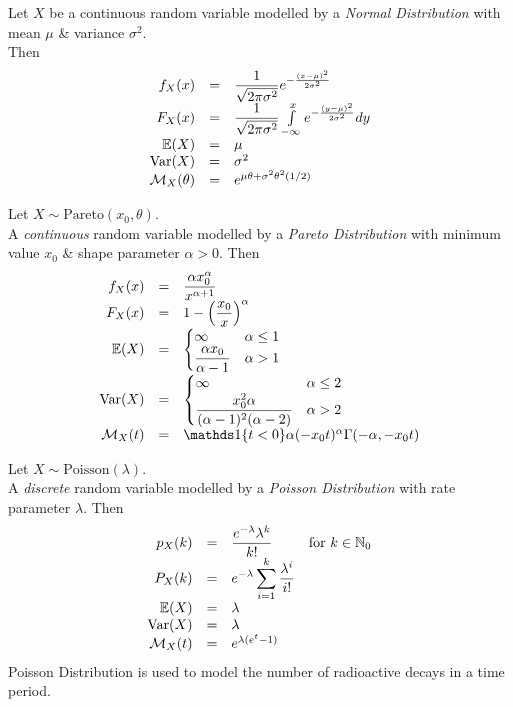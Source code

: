 \documentclass[11pt,a4paper]{article}
\begin{document}
Let $X$ be a continuous random variable modelled by a \textit{Normal Distribution} with mean $\mu$ \& variance $\sigma^2$.\\
Then
\[\begin{array}{rcl}
f_X(x)&=&\dfrac{1}{\sqrt{2\pi\sigma^2}}e^{-\frac{(x-\mu)^2}{2\sigma^2}}\\
F_X(x)&=&\dfrac{1}{\sqrt{2\pi\sigma^2}}\int\limits_{-\infty}^xe^{-\frac{(y-\mu)^2}{2\sigma^2}}dy\\
\mathbb{E}(X)&=&\mu\\
\mathrm{Var}(X)&=&\sigma^2\\
\mathcal{M}_X(\theta)&=&e^{\mu\theta+\sigma^2\theta^2(1/2)}
\end{array}\]

Let $X\sim\text{Pareto}(x_0,\theta)$.\\
A \textit{continuous} random variable modelled by a \textit{Pareto Distribution} with minimum value $x_0$ \& shape parameter $\alpha>0$. Then
\[\begin{array}{rcll}
f_X(x)&=&\dfrac{\alpha x_0^\alpha}{x^{\alpha+1}}\\
F_X(x)&=&1-\left(\dfrac{x_0}{x}\right)^\alpha\\
\expect(X)&=&\begin{cases}\infty&\alpha\leq1\\\dfrac{\alpha x_0}{\alpha-1}&\alpha>1\end{cases}\\
\var(X)&=&\begin{cases}\infty&\alpha\leq2\\\dfrac{x_0^2\alpha}{(\alpha-1)^2(\alpha-2)}&\alpha>2\end{cases}\\
\mathcal{M}_X(t)&=&\indicator\{t<0\}\alpha(-x_0t)^\alpha\Gamma(-\alpha,-x_0t)
\end{array}\]

Let $X\sim\text{Poisson}(\lambda)$.\\
A \textit{discrete} random variable modelled by a \textit{Poisson Distribution} with rate parameter $\lambda$. Then
\[\begin{array}{rcll}
p_X(k)&=&\dfrac{e^{-\lambda}\lambda^k}{k!}&\text{for }k\in\mathbb{N}_0\\
P_X(k)&=&{\displaystyle e^{-\lambda}\sum_{i=1}^k\frac{\lambda^i}{i!}}\\
\mathbb{E}(X)&=&\lambda\\
\mathrm{Var}(X)&=&\lambda\\
\mathcal{M}_X(t)&=&e^{\lambda(e^t-1)}
\end{array}\]
\nb Poisson Distribution is used to model the number of radioactive decays in a time period.\\
\end{document}
